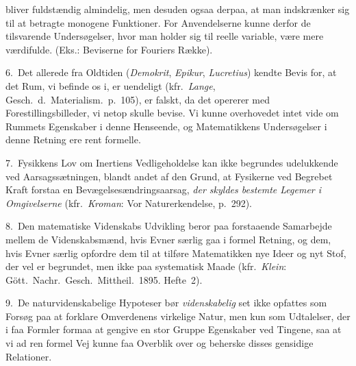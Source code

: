 \documentclass{article}
\begin{document}
bliver fuldstændig almindelig, men desuden ogsaa derpaa, at man indskrænker sig til at betragte monogene Funktioner. For Anvendelserne kunne derfor de tilsvarende Undersøgelser, hvor man holder sig til reelle variable, være mere værdifulde. (Eks.: Beviserne for Fouriers Række).

6.~Det allerede fra Oldtiden (\emph{Demokrit}, \emph{Epikur}, \emph{Lucretius}) kendte Bevis for, at det Rum, vi befinde os i, er uendeligt (kfr.\ \emph{Lange}, Gesch.\ d.\ Materialism.\ p.\ 105), er falskt, da det opererer med Forestillingsbilleder, vi netop skulle bevise. Vi kunne overhovedet intet vide om Rummets Egenskaber i denne Henseende, og Matematikkens Undersøgelser i denne Retning ere rent formelle.

7.~Fysikkens Lov om Inertiens Vedligeholdelse kan ikke begrundes udelukkende ved Aarsagssætningen, blandt andet af den Grund, at Fysikerne ved Begrebet Kraft forstaa en Bevægelsesændringsaarsag, \emph{der skyldes bestemte Legemer i Omgivelserne} (kfr.\ \emph{Kroman}: Vor Naturerkendelse, p.\ 292).

8.~Den matematiske Videnskabs Udvikling beror paa forstaaende Samarbejde mellem de Videnskabsmænd, hvis Evner særlig gaa i formel Retning, og dem, hvis Evner særlig opfordre dem til at tilføre Matematikken nye Ideer og nyt Stof, der vel er begrundet, men ikke paa systematisk Maade (kfr.\ \emph{Klein}: Gött.\ Nachr.\ Gesch.\ Mittheil.\ 1895. Hefte~2).

9.~De naturvidenskabelige Hypoteser bør \emph{videnskabelig} set ikke opfattes som Forsøg paa at forklare Omverdenens virkelige Natur, men kun som Udtalelser, der i faa Formler formaa at gengive en stor Gruppe Egenskaber ved Tingene, saa at vi ad ren formel Vej kunne faa Overblik over og beherske disses gensidige Relationer.
\end{document}
